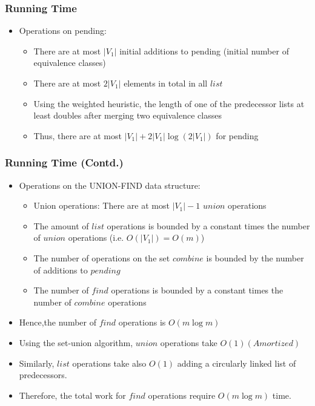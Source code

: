 \documentclass{beamer}
\begin{document}
\begin{frame}
  \frametitle{Running Time}
  \begin{itemize}
  \item Operations on pending:
    \begin{itemize}
    \item There are at most $|V_1|$ initial additions to pending (initial number of equivalence classes)
    \item There are at most $2 |V_1|$ elements in total in all $list$
    \item Using the weighted heuristic, the length of one of the predecessor lists at least doubles after merging two equivalence classes
    \item Thus, there are at most $|V_1| + 2|V_1| \log (2|V_1|)$ for pending
    \end{itemize}
  \end{itemize}
\end{frame}

\begin{frame}
  \frametitle{Running Time (Contd.)}
  \begin{itemize}
  \item Operations on the UNION-FIND data structure:
    \begin{itemize}
    \item Union operations: There are at most $|V_1| - 1$ $union$ operations
    \item The amount of $list$ operations is bounded by a constant times the number of $union$ operations (i.e. $O(|V_1|) = O(m)$)
    \item The number of operations on the set $combine$ is bounded by the number of additions to $pending$
    \item The number of $find$ operations is bounded by a constant times the number of $combine$ operations
    \end{itemize}
  \item Hence,the number of $find$ operations is $O(m \log m)$
  \item Using the set-union algorithm, $union$ operations take $O(1) (Amortized)$
  \item Similarly, $list$ operations take also $O(1)$ adding a circularly linked list of predecessors.
  \item Therefore, the total work for $find$ operations require $O(m \log m)$ time.
  \end{itemize}
\end{frame}
\end{document}
